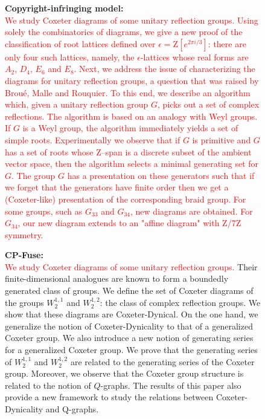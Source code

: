 \begin{figure}[!htbp]
    \begin{mdframed}[
        backgroundcolor=lightgray,
        linewidth=2pt,
        linecolor=lightblue,
        frametitle={\textbf{Prompt:} On Coxeter Diagrams of complex reflection groups},
        frametitlebackgroundcolor=lightblue!20,
        roundcorner=10pt,
        innerleftmargin=10pt,
        innerrightmargin=10pt,
        innertopmargin=10pt,
        innerbottommargin=10pt
    ]
    \raggedright
    \begin{minipage}[t]{\textwidth}
        \textbf{Copyright-infringing model:} \\
        \textcolor{red}{We study Coxeter diagrams of some unitary reflection groups. Using solely the combinatorics of diagrams, we give a new proof of the classification of root lattices defined over $\epsilon = \mathrm{Z}[e^{2 \pi i/3}]$: there are only four such lattices, namely, the $\epsilon$-lattices whose real forms are $A_2$, $D_4$, $E_6$ and $E_8$. Next, we address the issue of characterizing the diagrams for unitary reflection groups, a question that was raised by Broué, Malle and Rouquier. To this end, we describe an algorithm which, given a unitary reflection group $G$, picks out a set of complex reflections. The algorithm is based on an analogy with Weyl groups. If $G$ is a Weyl group, the algorithm immediately yields a set of simple roots. Experimentally we observe that if $G$ is primitive and $G$ has a set of roots whose $\mathrm{Z}$--span is a discrete subset of the ambient vector space, then the algorithm selects a minimal generating set for $G$. The group $G$ has a presentation on these generators such that if we forget that the generators have finite order then we get a (Coxeter-like) presentation of the corresponding braid group. For some groups, such as $G_{33}$ and $G_{34}$, new diagrams are obtained. For $G_{34}$, our new diagram extends to an "affine diagram" with $\mathrm{Z}/7\mathrm{Z}$ symmetry.} \\
    \end{minipage}
    \vspace{10pt}
    \begin{minipage}[t]{\textwidth}
        \textbf{CP-Fuse:} \\
        \textcolor{red}{We study Coxeter diagrams of some unitary reflection groups.} Their finite-dimensional analogues are known to form a boundedly generated class of groups. We define the set of Coxeter diagrams of the groups $W^{1,1}_{2}$ and $W^{1,2}_{2}$: the class of complex reflection groups. We show that these diagrams are Coxeter-Dynical. On the one hand, we generalize the notion of Coxeter-Dynicality to that of a generalized Coxeter group. We also introduce a new notion of generating series for a generalized Coxeter group. We prove that the generating series of $W^{1,1}_{2}$ and $W^{1,2}_{2}$ are related to the generating series of the Coxeter group. Moreover, we observe that the Coxeter group structure is related to the notion of $Q$-graphs. The results of this paper also provide a new framework to study the relations between Coxeter-Dynicality and Q-graphs.

\end{minipage}
\end{mdframed}
\end{figure}
